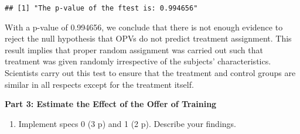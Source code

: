 \documentclass[
]{article}
\newenvironment{Shaded}{\begin{snugshade}}{\end{snugshade}}
\newcommand{\AttributeTok}[1]{\textcolor[rgb]{0.13,0.29,0.53}{#1}}
\newcommand{\CommentTok}[1]{\textcolor[rgb]{0.56,0.35,0.01}{\textit{#1}}}
\newcommand{\DecValTok}[1]{\textcolor[rgb]{0.00,0.00,0.81}{#1}}
\newcommand{\FunctionTok}[1]{\textcolor[rgb]{0.13,0.29,0.53}{\textbf{#1}}}
\newcommand{\NormalTok}[1]{#1}
\newcommand{\OtherTok}[1]{\textcolor[rgb]{0.56,0.35,0.01}{#1}}
\newcommand{\SpecialCharTok}[1]{\textcolor[rgb]{0.81,0.36,0.00}{\textbf{#1}}}
\newcommand{\StringTok}[1]{\textcolor[rgb]{0.31,0.60,0.02}{#1}}
\providecommand{\tightlist}{%
  \setlength{\itemsep}{0pt}\setlength{\parskip}{0pt}}
\begin{document}
\begin{Shaded}
\end{Shaded}

\begin{verbatim}
## [1] "The p-value of the ftest is: 0.994656"
\end{verbatim}

With a p-value of 0.994656, we conclude that there is not enough
evidence to reject the null hypothesis that OPVs do not predict
treatment assignment. This result implies that proper random assignment
was carried out such that treatment was given randomly irrespective of
the subjects' characteristics. Scientists carry out this test to ensure
that the treatment and control groups are similar in all respects except
for the treatment itself.

\textbf{Part 3: Estimate the Effect of the Offer of Training}

\begin{enumerate}
\def\labelenumi{\arabic{enumi}.}
\tightlist
\item
  Implement specs 0 (3 p) and 1 (2 p). Describe your findings.
\end{enumerate}
\end{document}
